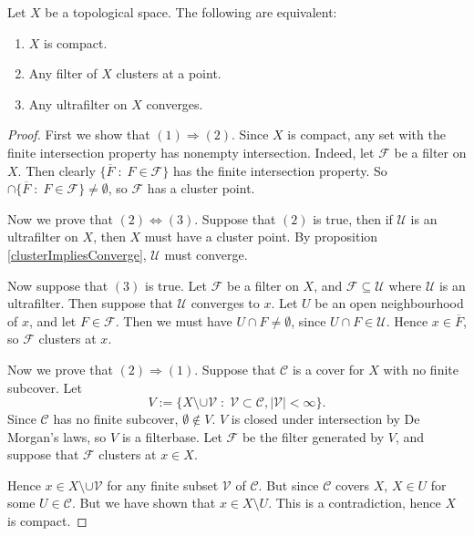 \begin{proposition}
    Let $X$ be a topological space. The following are equivalent:
    \begin{enumerate}
        \item{} $X$ is compact.
        \item{} Any filter of $X$ clusters at a point.
        \item{} Any ultrafilter on $X$ converges.
    \end{enumerate}
\end{proposition}
\begin{proof}
    First we show that $(1)\Rightarrow(2)$. Since $X$ is compact, any set
    with the finite intersection property has nonempty intersection. Indeed,
    let $\mathcal{F}$ be a filter on $X$. Then clearly $\{\overline{F}\;:\;F \in\mathcal{F}\}$
    has the finite intersection property. So $\cap\{\overline{F}\;:\;F \in\mathcal{F}\} \neq \emptyset$,
    so $\mathcal{F}$ has a cluster point.

    Now we prove that $(2)\Leftrightarrow(3)$. Suppose that $(2)$ is true,
    then if $\mathcal{U}$ is an ultrafilter on $X$, then $X$ must have a cluster
    point. By proposition \ref{clusterImpliesConverge}, $\mathcal{U}$
    must converge.

    Now suppose that $(3)$ is true. Let $\mathcal{F}$ be a filter on $X$,
    and $\mathcal{F} \subseteq \mathcal{U}$
    where $\mathcal{U}$ is an ultrafilter. Then suppose that $\mathcal{U}$
    converges to $x$. Let $U$ be an open neighbourhood of $x$, and let $F \in \mathcal{F}$.
    Then we must have $U\cap F \neq \emptyset$, since $U \cap F \in \mathcal{U}$. 
    Hence $x \in \overline{F}$, so $\mathcal{F}$ clusters at $x$.

    Now we prove that $(2)\Rightarrow(1)$. Suppose that $\mathcal{C}$ is a cover
    for $X$ with no finite subcover. Let
    \begin{equation*}
        V := \{X \setminus \cup \mathcal{V}\;:\;\mathcal{V} \subset \mathcal{C}, |\mathcal{V}| < \infty\}.
    \end{equation*}
    Since $\mathcal{C}$ has no finite subcover, $\emptyset \notin V$. $V$ is closed
    under intersection by De Morgan's laws, so $V$ is a filterbase. Let $\mathcal{F}$
    be the filter generated by $V$, and suppose that $\mathcal{F}$ clusters at $x \in X$. 

    Hence $x \in X \setminus \cup \mathcal{V}$ for any finite subset $\mathcal{V}$
    of $\mathcal{C}$. But since $\mathcal{C}$ covers $X$, $X \in U$ for some $U \in \mathcal{C}$.
    But we have shown that $x \in X\setminus U$. This is a contradiction,
    hence $X$ is compact.

\end{proof}

